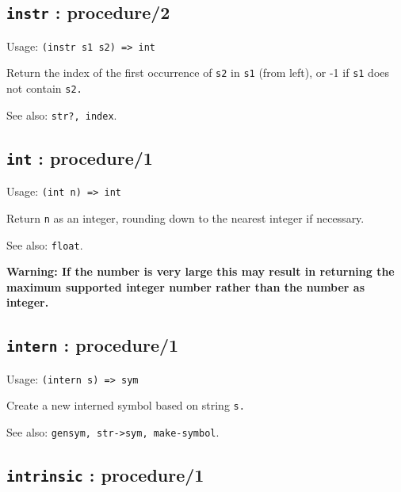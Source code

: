 \documentclass[
]{article}
\newcommand{\passthrough}[1]{#1}
\begin{document}
\hypertarget{instr-procedure2-1}{%
\subsection{\texorpdfstring{\texttt{instr} :
procedure/2}{instr : procedure/2}}\label{instr-procedure2-1}}

Usage: \passthrough{\lstinline!(instr s1 s2) => int!}

Return the index of the first occurrence of \passthrough{\lstinline!s2!}
in \passthrough{\lstinline!s1!} (from left), or -1 if
\passthrough{\lstinline!s1!} does not contain
\passthrough{\lstinline!s2.!}

See also: \passthrough{\lstinline!str?, index!}.

\hypertarget{int-procedure1-1}{%
\subsection{\texorpdfstring{\texttt{int} :
procedure/1}{int : procedure/1}}\label{int-procedure1-1}}

Usage: \passthrough{\lstinline!(int n) => int!}

Return \passthrough{\lstinline!n!} as an integer, rounding down to the
nearest integer if necessary.

See also: \passthrough{\lstinline!float!}.

\textbf{Warning: If the number is very large this may result in
returning the maximum supported integer number rather than the number as
integer.}

\hypertarget{intern-procedure1-1}{%
\subsection{\texorpdfstring{\texttt{intern} :
procedure/1}{intern : procedure/1}}\label{intern-procedure1-1}}

Usage: \passthrough{\lstinline!(intern s) => sym!}

Create a new interned symbol based on string
\passthrough{\lstinline!s.!}

See also: \passthrough{\lstinline!gensym, str->sym, make-symbol!}.

\hypertarget{intrinsic-procedure1-2}{%
\subsection{\texorpdfstring{\texttt{intrinsic} :
procedure/1}{intrinsic : procedure/1}}\label{intrinsic-procedure1-2}}
\end{document}
